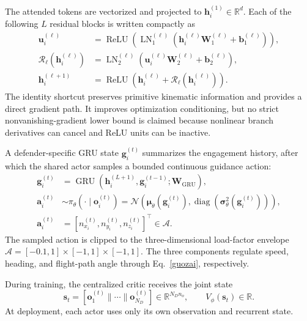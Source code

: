\documentclass[lettersize,journal]{IEEEtran}
\begin{document}
The attended tokens are vectorized and projected to $\mathbf h_i^{(1)}\in\mathbb R^d$.
Each of the following $L$ residual blocks is written compactly as
\begin{equation}
\label{eq:residual_block}
\begin{aligned}
\mathbf u_i^{(\ell)}&=\operatorname{ReLU}\!\left(
\operatorname{LN}_1^{(\ell)}
(\mathbf h_i^{(\ell)}\mathbf W_1^{(\ell)}+\mathbf b_1^{(\ell)})\right),\\
\mathcal R_{\ell}(\mathbf h_i^{(\ell)})&=
\operatorname{LN}_2^{(\ell)}\!\left(
\mathbf u_i^{(\ell)}\mathbf W_2^{(\ell)}+\mathbf b_2^{(\ell)}\right),\\
\mathbf h_i^{(\ell+1)}&=\operatorname{ReLU}
\left(\mathbf h_i^{(\ell)}+
\mathcal R_{\ell}(\mathbf h_i^{(\ell)})\right).
\end{aligned}
\end{equation}
The identity shortcut preserves primitive kinematic information and provides a direct gradient
path. It improves optimization conditioning, but no strict nonvanishing-gradient lower bound is
claimed because nonlinear branch derivatives can cancel and ReLU units can be inactive.

A defender-specific GRU state $\mathbf g_i^{(t)}$ summarizes the engagement history, after
which the shared actor samples a bounded continuous guidance action:
\begin{equation}
\label{eq:actor_policy}
\begin{aligned}
\mathbf g_i^{(t)}&=\operatorname{GRU}
(\mathbf h_i^{(L+1)},\mathbf g_i^{(t-1)};\mathbf W_{\mathrm{GRU}}),\\
\mathbf a_i^{(t)}&\sim\pi_{\theta}(\cdot\mid\mathbf o_i^{(t)})
=\mathcal N\!\left(\boldsymbol\mu_{\theta}(\mathbf g_i^{(t)}),
\operatorname{diag}(\boldsymbol\sigma_{\theta}^{2}(\mathbf g_i^{(t)}))\right),\\
\mathbf a_i^{(t)}&=[n_{x_i}^{(t)},n_{y_i}^{(t)},n_{z_i}^{(t)}]^{\top}
\in\mathcal A.
\end{aligned}
\end{equation}
The sampled action is clipped to the three-dimensional load-factor envelope
$\mathcal A=[-0.1,1]\times[-1,1]\times[-1,1]$. The three components regulate speed,
heading, and flight-path angle through Eq.~\eqref{guozai}, respectively.

During training, the centralized critic receives the joint state
\begin{equation}
\label{eq:critic_state}
\mathbf s_t=[\mathbf o_1^{(t)}\|\cdots\|\mathbf o_{N_D}^{(t)}]
\in\mathbb R^{N_Dn_o},\qquad V_{\phi}(\mathbf s_t)\in\mathbb R.
\end{equation}
At deployment, each actor uses only its own observation and recurrent state.
\end{document}
